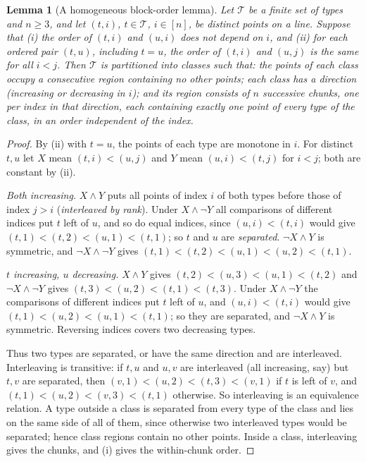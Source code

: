 \documentclass[11pt]{article}
\numberwithin{equation}{section}
\theoremstyle{plain}
\newtheorem{lemma}[theorem]{Lemma}
\theoremstyle{definition}
\theoremstyle{remark}
\theoremstyle{plain}
\begin{document}
\begin{lemma}[A homogeneous block-order lemma]
\label{lem:group-block-order}
Let $\mathcal T$ be a finite set of types and $n\ge3$, and let $(t,i)$, $t\in\mathcal T$, $i\in[n]$, be distinct
points on a line.  Suppose that \textup{(i)} the order of $(t,i)$ and $(u,i)$ does
not depend on $i$, and \textup{(ii)} for each ordered pair $(t,u)$, including
$t=u$, the order of $(t,i)$ and $(u,j)$ is the same for all $i<j$.  Then $\mathcal T$ is
partitioned into classes such that: the points of each class occupy a
consecutive region containing no other points; each class has a direction
(increasing or decreasing in $i$); and its region consists of $n$ successive
\emph{chunks}, one per index in that direction, each containing exactly one point
of every type of the class, in an order independent of the index.
\end{lemma}

\begin{proof}
By (ii) with $t=u$, the points of each type are monotone in $i$.  For distinct
$t,u$ let $X$ mean $(t,i)<(u,j)$ and $Y$ mean $(u,i)<(t,j)$ for $i<j$; both are
constant by (ii).

\emph{Both increasing.}  $X\wedge Y$ puts all points of index $i$ of both types
before those of index $j>i$ (\emph{interleaved by rank}).  Under $X\wedge\neg Y$
all comparisons of different indices put $t$ left of $u$, and so do equal indices,
since $(u,i)<(t,i)$ would give $(t,1)<(t,2)<(u,1)<(t,1)$; so $t$ and $u$ are
\emph{separated}.  $\neg X\wedge Y$ is symmetric, and $\neg X\wedge\neg Y$ gives
$(t,1)<(t,2)<(u,1)<(u,2)<(t,1)$.

\emph{$t$ increasing, $u$ decreasing.}  $X\wedge Y$ gives
$(t,2)<(u,3)<(u,1)<(t,2)$ and $\neg X\wedge\neg Y$ gives
$(t,3)<(u,2)<(t,1)<(t,3)$.  Under $X\wedge\neg Y$ the comparisons of different
indices put $t$ left of $u$, and $(u,i)<(t,i)$ would give
$(t,1)<(u,2)<(u,1)<(t,1)$; so they are separated, and $\neg X\wedge Y$ is
symmetric.  Reversing indices covers two decreasing types.

Thus two types are separated, or have the same direction and are interleaved.
Interleaving is transitive: if $t,u$ and $u,v$ are interleaved (all increasing,
say) but $t,v$ are separated, then $(v,1)<(u,2)<(t,3)<(v,1)$ if $t$ is left of $v$,
and $(t,1)<(u,2)<(v,3)<(t,1)$ otherwise.  So interleaving is an equivalence
relation.  A type outside a class is separated from every type of the class and
lies on the same side of all of them, since otherwise two interleaved types would
be separated; hence class regions contain no other points.  Inside a class,
interleaving gives the chunks, and (i) gives the within-chunk order.
\end{proof}
\end{document}
